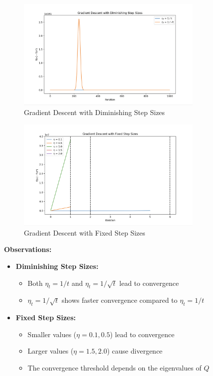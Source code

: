 \documentclass{article}
\begin{document}
\begin{enumerate}
\begin{enumerate}
        \begin{figure}[h]
        \centering
        \includegraphics[width=0.8\textwidth]{graph1.png}
        \caption{Gradient Descent with Diminishing Step Sizes}
        \end{figure}
    
        \begin{figure}[h]
        \centering
        \includegraphics[width=0.8\textwidth]{graph2.png}
        \caption{Gradient Descent with Fixed Step Sizes}
        \end{figure}
    
        \textbf{Observations:}
        \begin{itemize}
            \item \textbf{Diminishing Step Sizes:}
            \begin{itemize}
                \item Both $\eta_t = 1/t$ and $\eta_t = 1/\sqrt{t}$ lead to convergence
                \item $\eta_t = 1/\sqrt{t}$ shows faster convergence compared to $\eta_t = 1/t$
            \end{itemize}
    
            \item \textbf{Fixed Step Sizes:}
            \begin{itemize}
                \item Smaller values ($\eta = 0.1, 0.5$) lead to convergence
                \item Larger values ($\eta = 1.5, 2.0$) cause divergence
                \item The convergence threshold depends on the eigenvalues of $Q$
            \end{itemize}
        \end{itemize}
    

\end{enumerate}
\end{enumerate}
\end{document}
